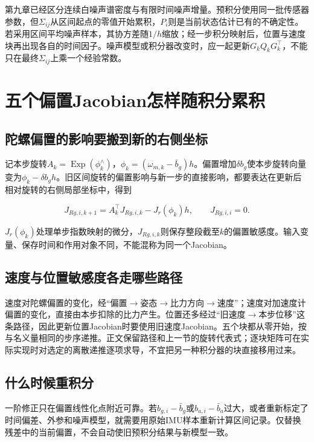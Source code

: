 第九章已经区分连续白噪声谱密度与有限时间噪声增量。预积分使用同一批传感器参数，但$\Sigma_{ij}$从区间起点的零值开始累积，$P_i$则是当前状态估计已有的不确定性。若采用区间平均噪声样本，其协方差随$1/h$缩放；经一步积分映射后，位置与速度块再出现各自的时间因子。噪声模型或积分器改变时，应一起更新$G_kQ_kG_k^\top$，不能只在最终$\Sigma_{ij}$上乘一个经验常数。

\section{五个偏置Jacobian怎样随积分累积}

\subsection{陀螺偏置的影响要搬到新的右侧坐标}

记本步旋转$A_k=\operatorname{Exp}(\phi_k^\wedge)$，$\phi_k=(\omega_{m,k}-\bar b_g)h$。偏置增加$\delta b_g$使本步旋转向量变为$\phi_k-\delta b_gh$。旧区间旋转的偏置影响与新一步的直接影响，都要表达在更新后相对旋转的右侧局部坐标中，得到

\begin{equation*}
J_{Rg,i,k+1}
=A_k^\top J_{Rg,i,k}-J_r(\phi_k)h,\qquad J_{Rg,i,i}=0.
\end{equation*}

$J_r(\phi_k)$处理单步指数映射的微分，$J_{Rg,i,k}$则保存整段截至$k$的偏置敏感度。输入变量、保存时间和作用对象不同，不能混称为同一个Jacobian。

\subsection{速度与位置敏感度各走哪些路径}

速度对陀螺偏置的变化，经“偏置$\to$姿态$\to$比力方向$\to$速度”；速度对加速度计偏置的变化，直接由本步扣除的比力产生。位置还多经过“旧速度$\to$本步位移”这条路径，因此更新位置Jacobian时要使用旧速度Jacobian。五个块都从零开始，按与名义量相同的步序递推。正文保留路径和上一节的旋转代表式；逐块矩阵可在实际实现时对选定的离散递推逐项求导，不宜把另一种积分器的块直接移用过来。

\subsection{什么时候重积分}

一阶修正只在偏置线性化点附近可靠。若$ b_{g,i}-\bar b_g$或$b_{a,i}-\bar b_a$过大，或者重新标定了时间偏差、外参和噪声模型，就需要用原始IMU样本重新计算区间记录。仅替换残差中的当前偏置，不会自动使旧预积分结果与新模型一致。

